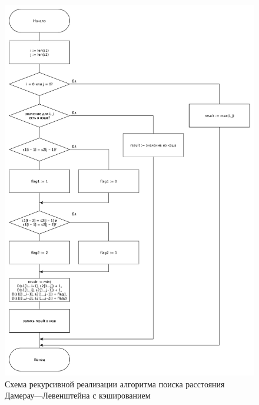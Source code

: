 \begin{figure}[H]
	\centering
	\includegraphics[scale=0.4]{assets/dam-lev-cache.pdf}
	\caption{Схема рекурсивной реализации алгоритма поиска расстояния Дамерау---Левенштейна с кэшированием}
	\label{pic:cache-dam-lev}
\end{figure}
